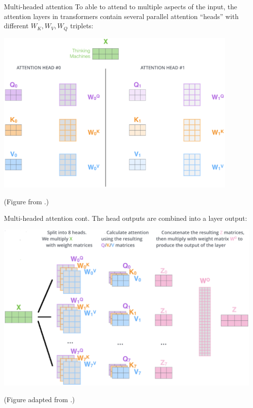 \documentclass[style=upen, size=14pt]{powerdot}
\theoremstyle{definition}
\begin{document}
\begin{slide}[toc=Multiple heads]{Multi-headed attention}
  To able to attend to multiple aspects of the input, the attention layers in
  transformers contain several parallel attention ``heads'' with different
  $W_K, W_V, W_Q$ triplets:
  
  \hspace{0.6cm}\includegraphics[width=0.9\textwidth]{figures/transformer_attention_heads_qkv.eps}
    
  \hspace{3cm}\footnotesize{(Figure from \cite{alammar2018illustrated}.)}
\end{slide}

\begin{slide}[toc=]{Multi-headed attention cont.}
  The head outputs are combined into a layer output:

  \includegraphics[width=1\textwidth]{figures/mhead2.eps}    

  \hspace{3cm}\footnotesize{(Figure adapted from
    \cite{alammar2018illustrated}.)}
\end{slide}
\end{document}
